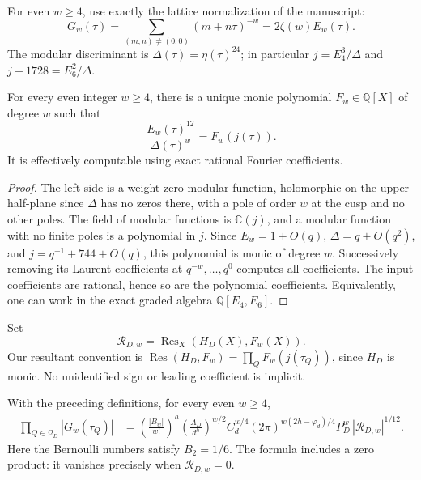 For even $w\geq4$, use exactly the lattice normalization of the manuscript:
\begin{equation}
 G_w(\tau)=\sum_{(m,n)\neq(0,0)}(m+n\tau)^{-w}
 =2\zeta(w)E_w(\tau).
 \label{cmnorm:eq:G}
\end{equation}
The modular discriminant is $\Delta(\tau)=\eta(\tau)^{24}$;
in particular $j=E_4^3/\Delta$ and $j-1728=E_6^2/\Delta$.

\begin{lemma}
\label{cmnorm:lem:polynomial}
For every even integer $w\geq4$, there is a unique monic polynomial
$F_w\in\mathbb Q[X]$ of degree $w$ such that
\begin{equation}
 \frac{E_w(\tau)^{12}}{\Delta(\tau)^w}=F_w(j(\tau)).
 \label{cmnorm:eq:Fw}
\end{equation}
It is effectively computable using exact rational Fourier coefficients.
\end{lemma}
\begin{proof}
The left side is a weight-zero modular function, holomorphic on the
upper half-plane since $\Delta$ has no zeros there, with a pole of order
$w$ at the cusp and no other poles. The field of modular functions is
$\mathbb C(j)$, and a modular function with no finite poles is a
polynomial in $j$. Since $E_w=1+O(q)$, $\Delta=q+O(q^2)$, and
$j=q^{-1}+744+O(q)$, this polynomial is monic of degree $w$.
Successively removing its Laurent coefficients at $q^{-w},\ldots,q^0$
computes all coefficients. The input coefficients are rational, hence so
are the polynomial coefficients. Equivalently, one can work in the exact
graded algebra $\mathbb Q[E_4,E_6]$.
\end{proof}

Set
\[
 \mathcal R_{D,w}=\operatorname{Res}_X(H_D(X),F_w(X)).
\]
Our resultant convention is
$\operatorname{Res}(H_D,F_w)=\prod_QF_w(j(\tau_Q))$, since $H_D$
is monic. No unidentified sign or leading coefficient is implicit.

\begin{theorem}
\label{cmnorm:thm:allweights}
With the preceding definitions, for every even $w\geq4$,
\begin{align}
 \prod_{Q\in\mathcal Q_D}|G_w(\tau_Q)|
 &=\left(\frac{|B_w|}{w!}\right)^h
   \left(\frac{A_D}{d^h}\right)^{w/2}
   C_d^{w/4}(2\pi)^{w(2h-\varphi_d)/4}
   P_D^w\,|\mathcal R_{D,w}|^{1/12}.
 \label{cmnorm:eq:allweights}
\end{align}
Here the Bernoulli numbers satisfy $B_2=1/6$. The formula includes a
zero product: it vanishes precisely when $\mathcal R_{D,w}=0$.
\end{theorem}

